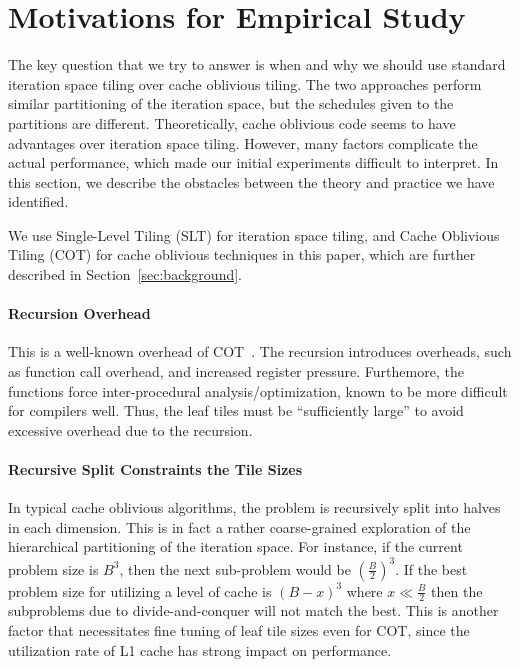 \section{Motivations for Empirical Study}
\label{sec:motivations}
The key question that we try to answer is when and why we should use standard
iteration space tiling over cache oblivious tiling.  The two approaches
perform similar partitioning of the iteration space, but the schedules given
to the partitions are different.  Theoretically, cache oblivious code seems to
have advantages over iteration space tiling.  However, many factors complicate
the actual performance, which made our initial experiments difficult to
interpret.  In this section, we describe the obstacles between the theory and
practice we have identified.

We use Single-Level Tiling (SLT) for iteration space tiling, and Cache
Oblivious Tiling (COT) for cache oblivious techniques in this
paper, which are further described in Section~\ref{sec:background}.

\paragraph{Recursion Overhead} This is a well-known overhead of
COT~\cite{yotov2007experimental}.  The recursion introduces overheads, such as
function call overhead, and increased register pressure.  Furthemore, the
functions force inter-procedural analysis/optimization, known to be more
difficult for compilers well.  Thus, the leaf tiles must be ``sufficiently
large'' to avoid excessive overhead due to the recursion.

 \paragraph{Recursive Split Constraints the Tile Sizes} In typical cache
 oblivious algorithms, the problem is recursively split into halves in each
 dimension. This is in fact a rather coarse-grained exploration of the
 hierarchical partitioning of the iteration space. For instance, if the
 current problem size is $B^3$, then the next sub-problem would be
 $(\frac{B}{2})^3$.  If the best problem size for utilizing a level of cache
 is $(B-x)^3$ where $x\ll \frac{B}{2}$ then the subproblems due to
 divide-and-conquer will not match the best.  This is another factor that
 necessitates fine tuning of leaf tile sizes even for COT, since the utilization
 rate of L1 cache has strong impact on performance.  

